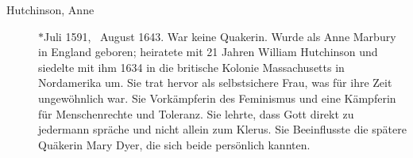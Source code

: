 \begin{description}
 \item[Hutchinson, Anne] $\ast$Juli 1591, \dag~August 1643. War keine Quakerin. Wurde als Anne Marbury in England geboren; heiratete mit 21 Jahren William Hutchinson und siedelte mit ihm 1634 in die britische Kolonie Massachusetts in Nordamerika um. Sie trat hervor als selbstsichere Frau, was für ihre Zeit ungewöhnlich war. Sie Vorkämpferin des Feminismus und eine Kämpferin für Menschenrechte und Toleranz. Sie lehrte, dass Gott direkt zu jedermann spräche und nicht allein zum Klerus. Sie Beeinflusste die spätere Quäkerin Mary Dyer, die sich beide persönlich kannten.


 \end{description}

\normalsize
